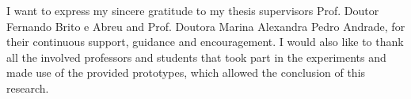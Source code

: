 
\acknowledgements

I want to express my sincere gratitude to my thesis supervisors Prof. Doutor Fernando Brito e Abreu and Prof. Doutora Marina Alexandra Pedro Andrade, for their continuous support, guidance and encouragement. I would also like to thank all the involved professors and students that took part in the experiments and made use of the provided prototypes, which allowed the conclusion of this research.


\cleardoublepage